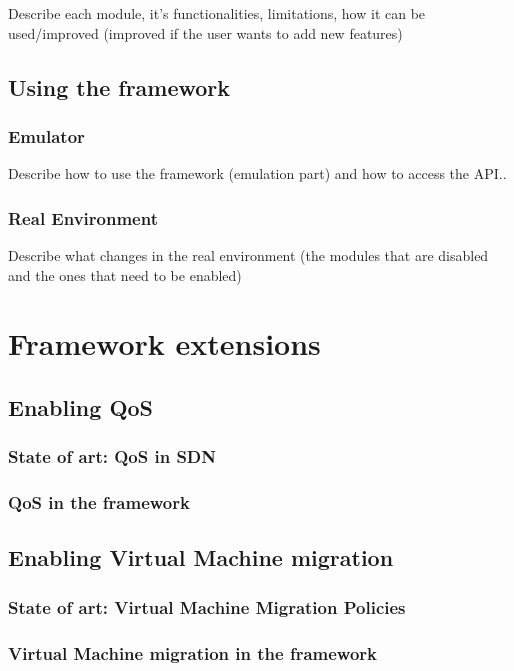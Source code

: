 \documentclass[12pt,english]{book}
\begin{document}
Describe each module, it's functionalities, limitations, how it can be used/improved (improved if the user wants to add new features)

\newpage


\section{Using the framework}

\subsection{Emulator}

Describe how to use the framework (emulation part) and how to access the API..

\subsection{Real Environment}

Describe what changes in the real environment (the modules that are disabled and the ones that need to be enabled)

\chapter{Framework extensions \label{cha:} }

\section{Enabling QoS}
\subsection{State of art: QoS in SDN}
\subsection{QoS in the framework}
\newpage

\section{Enabling Virtual Machine migration}
\subsection{State of art: Virtual Machine Migration Policies}
\subsection{Virtual Machine migration in the framework}
\end{document}
